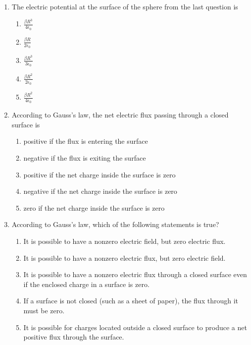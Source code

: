 \documentclass[12pt]{article}
\begin{document}
\begin{enumerate}[leftmargin=50pt,label=\underline{\hspace{0.4in}} \arabic*.]
\item The electric potential at the surface of the sphere from the last
  question is
  \begin{enumerate}[noitemsep,topsep=0pt,leftmargin=18pt,label=(\Alph*)]
  \item $\displaystyle\frac{\beta R^3}{4\epsilon_0}$
  \item $\displaystyle\frac{\beta R}{2\epsilon_0}$
  \item $\displaystyle\frac{\beta R^3}{3\epsilon_0}$
  \item $\displaystyle\frac{\beta R^2}{2\epsilon_0}$
  \item $\displaystyle\frac{\beta R^2}{4\epsilon_0}$
  \end{enumerate}

\item According to Gauss's law, the net electric flux passing through a closed
  surface is
  \begin{enumerate}[noitemsep,topsep=0pt,leftmargin=18pt,label=(\Alph*)]
  \item positive if the flux is entering the surface
  \item negative if the flux is exiting the surface
  \item positive if the net charge inside the surface is zero
  \item negative if the net charge inside the surface is zero
  \item zero if the net charge inside the surface is zero
  \end{enumerate}
  \newpage
\item According to Gauss's law, which of the following statements is true?
  \begin{enumerate}[noitemsep,topsep=0pt,leftmargin=18pt,label=(\Alph*)]
  \item It is possible to have a nonzero electric field, but zero electric flux.
  \item It is possible to have a nonzero electric flux, but zero electric field.
  \item It is possible to have a nonzero electric flux through a closed surface
    even if the enclosed charge in a surface is zero.
  \item If a surface is not closed (such as a sheet of paper), the flux through
    it must be zero.
  \item It is possible for charges located outside a closed surface to produce
    a net positive flux through the surface.
  \end{enumerate}


\end{enumerate}
\end{document}
